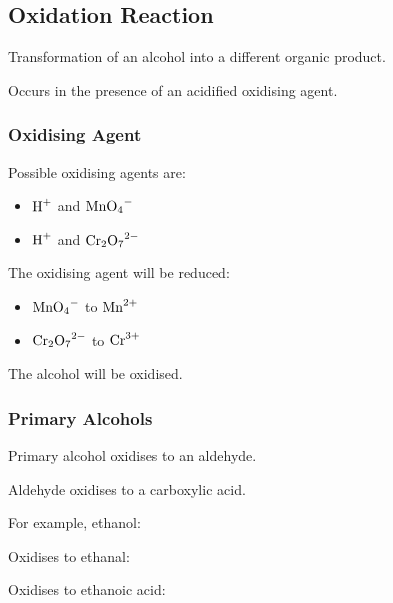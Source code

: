 \documentclass[a4paper,11pt]{article}
\begin{document}
\subsection{Oxidation Reaction}

Transformation of an alcohol into a different organic product.

Occurs in the presence of an acidified oxidising agent.


\subsubsection{Oxidising Agent}

Possible oxidising agents are:

\begin{itemize}
\item $\ce{H+}$ and $\ce{MnO4-}$
\item $\ce{H+}$ and $\ce{Cr2O7^2-}$
\end{itemize}

The oxidising agent will be reduced:

\begin{itemize}
\item $\ce{MnO4-}$ to $\ce{Mn^2+}$
\item $\ce{Cr2O7^2-}$ to $\ce{Cr^3+}$
\end{itemize}

The alcohol will be oxidised.


\subsubsection{Primary Alcohols}

Primary alcohol oxidises to an aldehyde.

Aldehyde oxidises to a carboxylic acid.

For example, ethanol:

\begin{center}
\end{center}

Oxidises to ethanal:

\begin{center}
\end{center}

Oxidises to ethanoic acid:

\begin{center}
\end{center}
\end{document}
